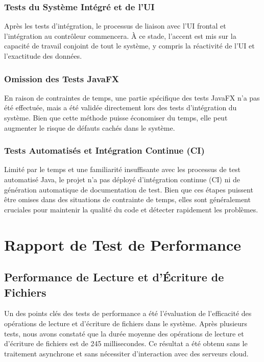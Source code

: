 \documentclass{article}
\begin{document}
\subsubsection{Tests du Système Intégré et de l'UI}
Après les tests d'intégration, le processus de liaison avec l'UI frontal et l'intégration au contrôleur commencera. À ce stade, l'accent est mis sur la capacité de travail conjoint de tout le système, y compris la réactivité de l'UI et l'exactitude des données.
\subsubsection{Omission des Tests JavaFX}
En raison de contraintes de temps, une partie spécifique des tests JavaFX n'a pas été effectuée, mais a été validée directement lors des tests d'intégration du système. Bien que cette méthode puisse économiser du temps, elle peut augmenter le risque de défauts cachés dans le système.
\subsubsection{Tests Automatisés et Intégration Continue (CI)}
Limité par le temps et une familiarité insuffisante avec les processus de test automatisé Java, le projet n'a pas déployé d'intégration continue (CI) ni de génération automatique de documentation de test. Bien que ces étapes puissent être omises dans des situations de contrainte de temps, elles sont généralement cruciales pour maintenir la qualité du code et détecter rapidement les problèmes.

\section{Rapport de Test de Performance}
\subsection{Performance de Lecture et d'Écriture de Fichiers}
Un des points clés des tests de performance a été l'évaluation de l'efficacité des opérations de lecture et d'écriture de fichiers dans le système. Après plusieurs tests, nous avons constaté que la durée moyenne des opérations de lecture et d'écriture de fichiers est de 245 millisecondes. Ce résultat a été obtenu sans le traitement asynchrone et sans nécessiter d'interaction avec des serveurs cloud.
\end{document}
